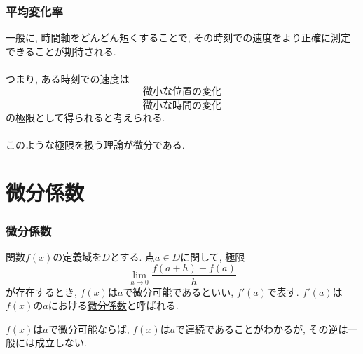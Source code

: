 

\begin{frame}
\frametitle{平均変化率}


一般に, 時間軸をどんどん短くすることで, その時刻での速度をより正確に測定できることが期待される.\\
\ \\

つまり, ある時刻での速度は
$$
\frac{\text{微小な位置の変化}}{\text{微小な時間の変化}}
$$
の極限として得られると考えられる. \\
\ \\

このような極限を扱う理論が微分である. 


\end{frame}



\section{微分係数}

\begin{frame}
\frametitle{微分係数}

\begin{Def}
関数$f(x)$の定義域を$D$とする. 
点$a \in D$に関して, 極限
$$
\lim_{h\to 0} \frac{f(a+h)-f(a)}{h}
$$
が存在するとき, $f(x)$は$a$で\underline{微分可能}であるといい, $f'(a)$で表す. 
$f'(a)$は$f(x)$の$a$における\underline{微分係数}と呼ばれる. 
\end{Def}

$f(x)$は$a$で微分可能ならば, $f(x)$は$a$で連続であることがわかるが, その逆は一般には成立しない. 


\end{frame}




